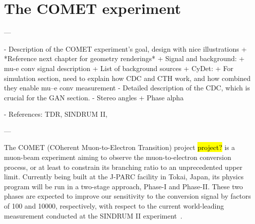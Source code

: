 \chapter{The COMET experiment}\label{chapter2}

\begin{markdown}
---

- Description of the COMET experiment's goal, design with nice illustrations
    + *Reference next chapter for geometry renderings*
    + Signal and background:
        + mu-e conv signal description
        + List of background sources
+ CyDet:
    + For simulation section, need to explain how CDC and CTH work, and how combined they enable mu--e conv measurement
    - Detailed description of the CDC, which is crucial for the GAN section.
     - Stereo angles
+ Phase alpha

- References: TDR, SINDRUM II, 

---
\end{markdown}

The COMET (COherent Muon-to-Electron Transition) project \hl{project?} is a muon-beam experiment aiming to observe the muon-to-electron conversion process, or at least to constrain its branching ratio to an unprecedented upper limit.
Currently being built at the J-PARC facility in Tokai, Japan, its physics program will be run in a two-stage approach, Phase-I and Phase-II. These two phases are expected to improve our sensitivity to the conversion signal by factors of 100 and \num{10000}, respectively, with respect to the current world-leading measurement conducted at the SINDRUM II experiment~\cite{Bertl:2006up}.



